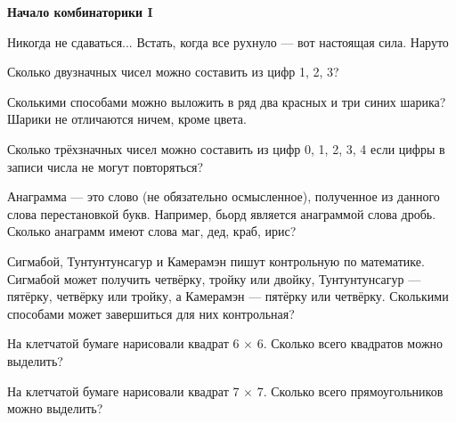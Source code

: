 \centerline{\bf \Huge Начало комбинаторики I}

\begin{flushright}
        \scriptsize{Никогда не сдаваться... Встать, когда все рухнуло — вот настоящая сила. Наруто}
\end{flushright}

 Сколько двузначных чисел можно составить из цифр 1, 2, 3?

 Сколькими способами можно выложить в ряд два красных и три синих шарика? Шарики
не отличаются ничем, кроме цвета.

 Сколько трёхзначных чисел можно составить из цифр 0, 1, 2, 3, 4 если цифры в записи числа
не могут повторяться?

 Анаграмма — это слово (не обязательно осмысленное), полученное из данного слова перестановкой букв. Например, бьорд является анаграммой слова дробь. Сколько анаграмм имеют
слова маг, дед, краб, ирис?

 Сигмабой, Тунтунтунсагур и Камерамэн пишут контрольную по математике. Сигмабой может получить четвёрку, тройку или двойку, Тунтунтунсагур — пятёрку, четвёрку или тройку, а Камерамэн — пятёрку или четвёрку. Сколькими способами может завершиться для них контрольная?

 На клетчатой бумаге нарисовали квадрат 6 $\times$ 6. Сколько всего квадратов можно выделить?

 На клетчатой бумаге нарисовали квадрат 7 $\times$ 7. Сколько всего прямоугольников можно выделить?